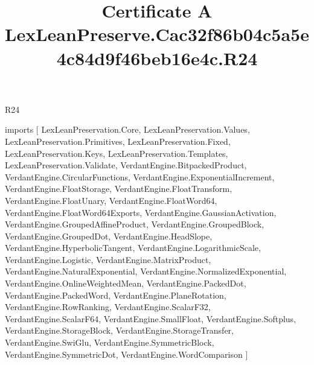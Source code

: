 \begin{lexlean}{R24}
\title{Certificate A LexLeanPreserve.Cac32f86b04c5a5e4c84d9f46beb16e4c.R24}
\begin{coremodule}
imports [
  LexLeanPreservation.Core,
  LexLeanPreservation.Values,
  LexLeanPreservation.Primitives,
  LexLeanPreservation.Fixed,
  LexLeanPreservation.Keys,
  LexLeanPreservation.Templates,
  LexLeanPreservation.Validate,
  VerdantEngine.BitpackedProduct,
  VerdantEngine.CircularFunctions,
  VerdantEngine.ExponentialIncrement,
  VerdantEngine.FloatStorage,
  VerdantEngine.FloatTransform,
  VerdantEngine.FloatUnary,
  VerdantEngine.FloatWord64,
  VerdantEngine.FloatWord64Exports,
  VerdantEngine.GaussianActivation,
  VerdantEngine.GroupedAffineProduct,
  VerdantEngine.GroupedBlock,
  VerdantEngine.GroupedDot,
  VerdantEngine.HeadSlope,
  VerdantEngine.HyperbolicTangent,
  VerdantEngine.LogarithmicScale,
  VerdantEngine.Logistic,
  VerdantEngine.MatrixProduct,
  VerdantEngine.NaturalExponential,
  VerdantEngine.NormalizedExponential,
  VerdantEngine.OnlineWeightedMean,
  VerdantEngine.PackedDot,
  VerdantEngine.PackedWord,
  VerdantEngine.PlaneRotation,
  VerdantEngine.RowRanking,
  VerdantEngine.ScalarF32,
  VerdantEngine.ScalarF64,
  VerdantEngine.SmallFloat,
  VerdantEngine.Softplus,
  VerdantEngine.StorageBlock,
  VerdantEngine.StorageTransfer,
  VerdantEngine.SwiGlu,
  VerdantEngine.SymmetricBlock,
  VerdantEngine.SymmetricDot,
  VerdantEngine.WordComparison
]


\end{coremodule}
\end{lexlean}
